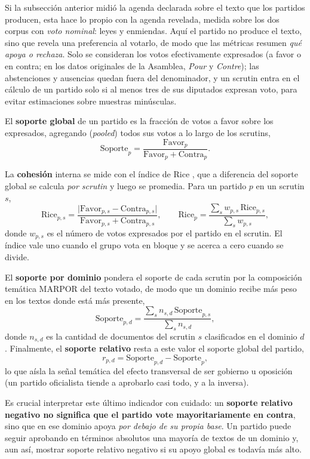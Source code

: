 Si la subsección anterior midió la agenda declarada sobre el texto que los
partidos producen, esta hace lo propio con la agenda revelada, medida sobre los
dos corpus con \emph{voto nominal}: leyes y enmiendas. Aquí el partido no produce
el texto, sino que revela una preferencia al votarlo, de modo que las métricas
resumen \emph{qué apoya o rechaza}. Solo se
consideran los votos efectivamente expresados (a favor o en contra; en los datos
originales de la Asamblea, \emph{Pour} y \emph{Contre}); las
abstenciones y ausencias quedan fuera del denominador, y un scrutin entra en el
cálculo de un partido solo si al menos tres de sus diputados expresan voto, para
evitar estimaciones sobre muestras minúsculas.

El \textbf{soporte global} de un partido es la fracción de votos a favor sobre
los expresados, agregando (\emph{pooled}) todos sus votos a lo largo de los
scrutins,
\[
\text{Soporte}_p = \frac{\text{Favor}_p}{\text{Favor}_p + \text{Contra}_p}.
\]

La \textbf{cohesión} interna se mide con el índice de Rice
\cite{rice1928quantitative}, que a diferencia del soporte global se calcula
\emph{por scrutin} y luego se promedia. Para un partido $p$ en un scrutin $s$,
\[
\text{Rice}_{p,s} = \frac{\lvert \text{Favor}_{p,s} - \text{Contra}_{p,s} \rvert}{\text{Favor}_{p,s} + \text{Contra}_{p,s}},
\qquad
\text{Rice}_p = \frac{\sum_{s} w_{p,s}\,\text{Rice}_{p,s}}{\sum_{s} w_{p,s}},
\]
donde $w_{p,s}$ es el número de votos expresados por el partido en el scrutin.
El índice vale uno cuando el grupo vota en bloque y se acerca a cero cuando se
divide.

El \textbf{soporte por dominio} pondera el soporte de cada scrutin por la
composición temática MARPOR del texto votado, de modo que un dominio recibe más
peso en los textos donde está más presente,
\[
\text{Soporte}_{p,d} = \frac{\sum_{s} n_{s,d}\,\text{Soporte}_{p,s}}{\sum_{s} n_{s,d}},
\]
donde $n_{s,d}$ es la cantidad de documentos del scrutin $s$ clasificados en el
dominio $d$. Finalmente, el \textbf{soporte relativo} resta a este valor el
soporte global del partido,
\[
r_{p,d} = \text{Soporte}_{p,d} - \text{Soporte}_p,
\]
lo que aísla la señal temática del efecto transversal de ser gobierno u
oposición (un partido oficialista tiende a aprobarlo casi todo, y a la inversa).

Es crucial interpretar este último indicador con cuidado: un \textbf{soporte
relativo negativo no significa que el partido vote mayoritariamente en contra},
sino que en ese dominio apoya \emph{por debajo de su propia base}. Un partido
puede seguir aprobando en términos absolutos una mayoría de textos de un dominio
y, aun así, mostrar soporte relativo negativo si su apoyo global es todavía más
alto.

